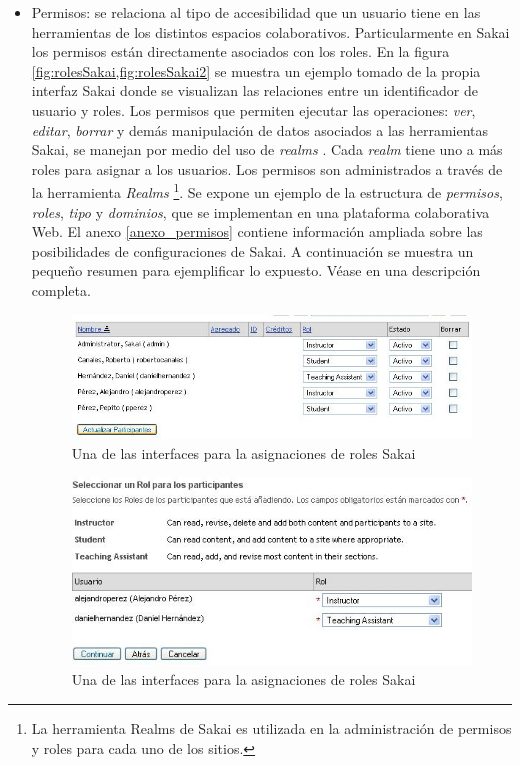 \begin{itemize}
\item Permisos: se relaciona al tipo de accesibilidad que un usuario tiene
en las herramientas de los distintos espacios colaborativos. Particularmente en
Sakai los permisos están directamente asociados con los roles. En la figura
\ref{fig:rolesSakai,fig:rolesSakai2} se muestra un ejemplo tomado de la propia
interfaz Sakai
donde se visualizan las relaciones entre un identificador de usuario y roles. 
Los permisos que permiten ejecutar las operaciones: \textit{ver}, \textit{editar}, \textit{borrar} y demás manipulación de datos asociados a las herramientas Sakai, se manejan por medio del uso de \textit{realms}
\cite{sakaimanual}. Cada \textit{realm} tiene uno a más roles para asignar a los usuarios. Los permisos son administrados a través de la herramienta \textit{Realms} \footnote{La herramienta Realms de Sakai es utilizada en la administración de permisos y roles para cada uno de los sitios.}. Se expone un ejemplo de la
estructura de \textit{permisos}, \textit{roles}, \textit{tipo} y \textit{dominios}, que se implementan en una
plataforma colaborativa Web. El anexo \ref{anexo_permisos} contiene información ampliada sobre las posibilidades de configuraciones de Sakai. A continuación se muestra un pequeño resumen para ejemplificar lo expuesto.
Véase en \cite{permisos_roles} una descripción completa. 

\begin{figure} 
\begin{center}
 \includegraphics [width=4 in,totalheight=2 in] {Ch1/Figuras/RolesSakai.jpg}
\caption {Una de las interfaces para la asignaciones de roles Sakai}
\label{fig:rolesSakai}
\end{center}
\end{figure}


\begin{figure} 
\begin{center}
 \includegraphics [width=4 in,totalheight=2 in] {Ch1/Figuras/RolesSakai2.jpg}
\caption {Una de las interfaces para la asignaciones de roles Sakai}
\label{fig:rolesSakai2}
\end{center}
\end{figure}




\end{itemize}
